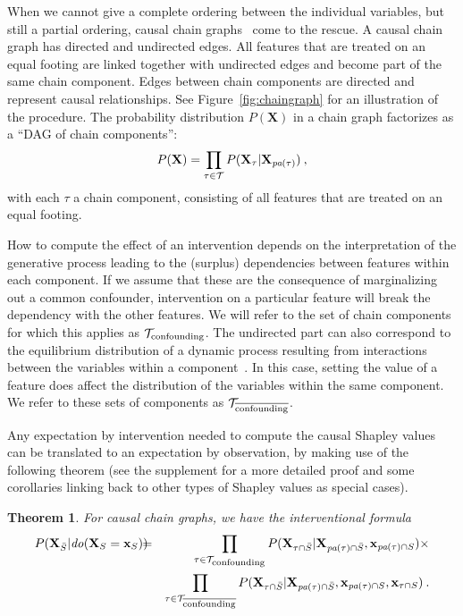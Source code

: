 \documentclass{article}
\newcommand{\vX}{\mathbf{X}}
\newcommand{\vx}{\mathbf{x}}
\newcommand{\dodo}{\mathit{do}}
\newcommand{\lvdo}[1]{\dodo(\vX_{#1} = \vx_{#1})}
\newcommand{\spa}{\mathop{\textit{\scriptsize pa}}}
\newcommand{\onder}[2]{{#1}_{\mbox{\scriptsize #2}}}
\newcommand{\isequal}{\hspace*{-2.5mm} & = & \hspace*{-2.5mm}}
\newcommand{\chaincomponents}{{\cal T}}
\newtheorem{theorem}{Theorem}
\begin{document}
When we cannot give a complete ordering between the individual variables, but still a partial ordering, 
causal chain graphs~\cite{lauritzen2002chain} come to the rescue. A causal chain graph has directed and undirected edges. All features that are treated on an equal footing are linked together with undirected edges and become part of the same chain component. Edges between chain components are directed and represent causal relationships. See Figure~\ref{fig:chaingraph} for an illustration of the procedure. The probability distribution $P(\vX)$ in a chain graph factorizes as a ``DAG of chain components'':
\[
P(\vX) = \prod_{\tau \in \chaincomponents} P(\vX_\tau|\vX_{\spa(\tau)}) \: ,
\]
with each $\tau$ a chain component, consisting of all features that are treated on an equal footing.

How to compute the effect of an intervention depends on the interpretation of the generative process leading to the (surplus) dependencies between features within each component. If we assume that these are the consequence of marginalizing out a common confounder,
intervention on a particular feature will break the dependency with the other features. We will refer to the set of chain components for which this applies as $\onder{\chaincomponents}{confounding}$. The undirected part can also correspond to the equilibrium distribution of a dynamic process resulting from interactions between the variables within a component~\cite{lauritzen2002chain}.
In this case, setting the value of a feature does affect the distribution of the variables within the same component. We refer to these sets of components as $\chaincomponents_{\overline{\textrm{\upshape \scriptsize confounding}}}$.

Any expectation by intervention needed to compute the causal Shapley values can be translated to an expectation by observation, by making use of the following theorem (see the supplement for a more detailed proof and some corollaries linking back to other types of Shapley values as special cases).
\begin{theorem}
For causal chain graphs, we have the interventional formula 
\begin{eqnarray}
P(\vX_{\bar{S}}|\lvdo{S}) \isequal \prod_{\tau \in \chaincomponents_{\textrm{\upshape \scriptsize confounding}}} P(\vX_{\tau \cap \bar{S}}|\vX_{\spa(\tau)  \cap \bar{S}},\vx_{\spa(\tau) \cap S}) \times \\ \nonumber
&& \prod_{\tau \in \chaincomponents_{\overline{\textrm{\upshape \scriptsize confounding}}}} P(\vX_{\tau \cap \bar{S}}|\vX_{\spa(\tau) \cap \bar{S}},\vx_{\spa(\tau) \cap S},\vx_{\tau \cap S}) \: .
\label{eq:chaininterventional}
\end{eqnarray}
\end{theorem}
\end{document}
